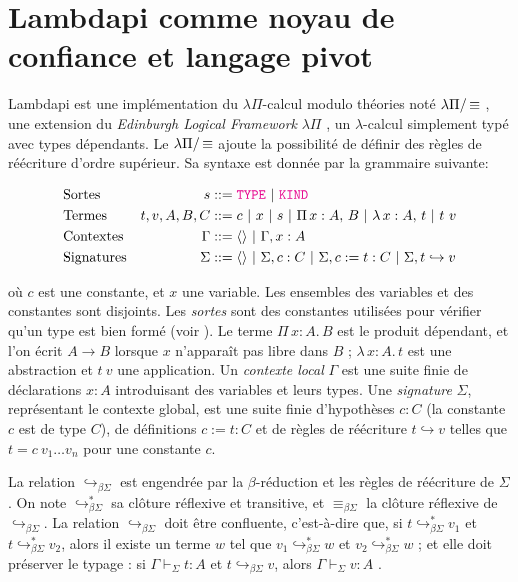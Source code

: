 \section*{Lambdapi comme noyau de confiance et langage pivot}

Lambdapi est une implémentation du $\lambda\Pi$-calcul modulo théories noté $\lambda\Pi/\mathop{\equiv}$ \cite{lambdapi}, une extension du \emph{Edinburgh Logical Framework} $\lambda\Pi$ \cite{lf}, un $\lambda$-calcul simplement typé avec types dépendants.
Le $\lambda\Pi/\mathop{\equiv}$ ajoute la possibilité de définir des règles de réécriture d'ordre supérieur. Sa syntaxe est donnée par la grammaire suivante:

\begin{align*}
&\text{Sortes}  &s &::= \type ~|~ \kind \\
&\text{Termes}   &t,v, A,B,C &::= c ~|~ x ~|~ s ~|~ \Pi\,x : A,\,B~|~ \lambda\,x : A,\,t ~|~t~v \\
&\text{Contextes}   &\Gamma &::= \langle \rangle ~|~ \Gamma, x : A \\
&\text{Signatures}  &\Sigma &::= \langle \rangle ~|~ \Sigma, c : C ~|~ \Sigma, c := t : C ~|~ \Sigma, t \hookrightarrow v 
\end{align*}

où $c$ est une constante, et $x$ une variable. Les ensembles des variables et des constantes sont disjoints. Les \emph{sortes} sont des constantes utilisées pour vérifier qu'un type est bien formé (voir \cite[\S 2.1]{lf}).
Le terme $\Pi\,x : A.\,B$ est le produit dépendant, et l'on écrit $A \rightarrow B$ lorsque $x$ n'apparaît pas libre dans $B$ ; $\lambda\,x : A.\,t$ est une abstraction et $t~v$ une application. Un \emph{contexte local} $\Gamma$ est une suite finie de déclarations $x:A$ introduisant des variables et leurs types.
Une \emph{signature} $\Sigma$, représentant le contexte global, est une suite finie d'hypothèses $c : C$ (la constante $c$ est de type $C$), de définitions $c := t : C$ et de règles de réécriture $t \hookrightarrow v$ telles que $t = c~v_1 \dots v_n$ pour une constante $c$.

La relation $\hookrightarrow_{\beta\Sigma}$ est engendrée par la $\beta$-réduction et les règles de réécriture de $\Sigma$. On note $\hookrightarrow_{\beta\Sigma}^*$ sa clôture réflexive et transitive, et $\equiv_{\beta\Sigma}$ la clôture réflexive de $\hookrightarrow_{\beta\Sigma}$.
La relation $\hookrightarrow_{\beta\Sigma}$ doit être confluente, c'est-à-dire que, si $t \hookrightarrow_{\beta\Sigma}^* v_1$ et $t \hookrightarrow_{\beta\Sigma}^* v_2$, alors il existe un terme $w$ tel que $v_1 \hookrightarrow_{\beta\Sigma}^* w$ et $v_2 \hookrightarrow_{\beta\Sigma}^* w$ ; et elle doit préserver le typage : si $\Gamma \vdash_\Sigma t: A$ et $t \hookrightarrow_{\beta\Sigma} v$, alors $\Gamma \vdash_\Sigma v: A$ \cite{blanqui:LIPIcs.FSCD.2020.13}.

